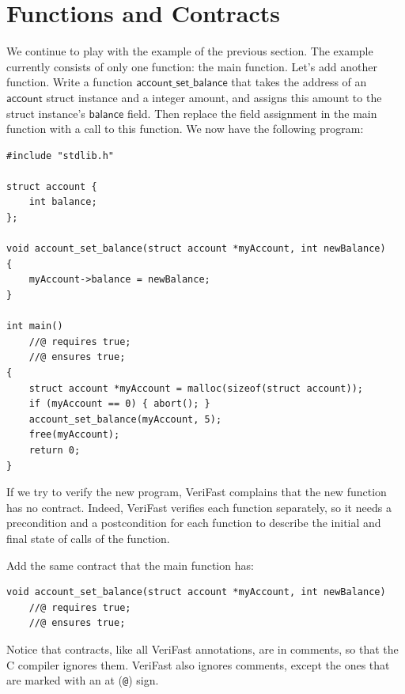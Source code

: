 \documentclass{article}
\begin{document}
\section{Functions and Contracts}\label{section:functions}

We continue to play with the example of the previous section.
The example currently consists of only one function: the main
function. Let's add another function. Write a function
$\mathsf{account\_set\_balance}$ that takes the address of an
$\mathsf{account}$ struct instance and a integer amount, and
assigns this amount to the struct instance's $\mathsf{balance}$
field. Then replace the field assignment in the main function
with a call to this function. We now have the following
program:

\begin{lstlisting}
#include "stdlib.h"

struct account {
    int balance;
};

void account_set_balance(struct account *myAccount, int newBalance)
{
    myAccount->balance = newBalance;
}

int main()
    //@ requires true;
    //@ ensures true;
{
    struct account *myAccount = malloc(sizeof(struct account));
    if (myAccount == 0) { abort(); }
    account_set_balance(myAccount, 5);
    free(myAccount);
    return 0;
}
\end{lstlisting}

If we try to verify the new program, VeriFast complains that
the new function has no contract. Indeed, VeriFast verifies
each function separately, so it needs a precondition and a
postcondition for each function to describe the initial and
final state of calls of the function.

Add the same contract that the main function has:
\begin{lstlisting}
void account_set_balance(struct account *myAccount, int newBalance)
    //@ requires true;
    //@ ensures true;
\end{lstlisting}
Notice that contracts, like all VeriFast annotations, are in
comments, so that the C compiler ignores them. VeriFast also
ignores comments, except the ones that are marked with an at
(\verb|@|) sign.
\end{document}
